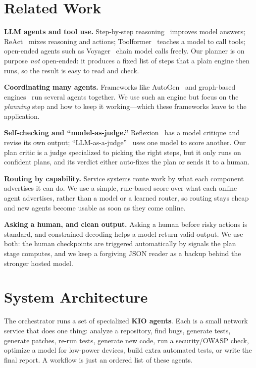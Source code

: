\documentclass[conference]{IEEEtran}
\begin{document}
\section{Related Work}
\textbf{LLM agents and tool use.} Step-by-step reasoning~\cite{cot} improves model
answers; ReAct~\cite{react} mixes reasoning and actions; Toolformer~\cite{toolformer}
teaches a model to call tools; open-ended agents such as Voyager~\cite{voyager}
chain model calls freely. Our planner is on purpose \emph{not} open-ended: it
produces a fixed list of steps that a plain engine then runs, so the result is easy
to read and check.

\textbf{Coordinating many agents.} Frameworks like AutoGen~\cite{autogen} and
graph-based engines~\cite{langgraph} run several agents together. We use such an
engine but focus on the \emph{planning} step and how to keep it working---which
these frameworks leave to the application.

\textbf{Self-checking and ``model-as-judge.''} Reflexion~\cite{reflexion} has a
model critique and revise its own output; ``LLM-as-a-judge''~\cite{judge} uses one
model to score another. Our plan critic is a judge specialized to picking the right
steps, but it only runs on confident plans, and its verdict either auto-fixes the
plan or sends it to a human.

\textbf{Routing by capability.} Service systems route work by what each component
advertises it can do. We use a simple, rule-based score over what each online agent
advertises, rather than a model or a learned router, so routing stays cheap and new
agents become usable as soon as they come online.

\textbf{Asking a human, and clean output.} Asking a human before risky actions is
standard, and constrained decoding helps a model return valid output. We use both:
the human checkpoints are triggered automatically by signals the plan stage
computes, and we keep a forgiving JSON reader as a backup behind the stronger
hosted model.

\section{System Architecture}
The orchestrator runs a set of specialized \textbf{KIO agents}. Each is a small
network service that does one thing: analyze a repository, find bugs, generate
tests, generate patches, re-run tests, generate new code, run a security/OWASP
check, optimize a model for low-power devices, build extra automated tests, or
write the final report. A workflow is just an ordered list of these agents.
\end{document}
